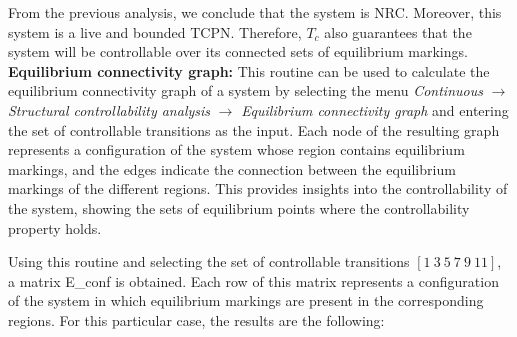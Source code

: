 From the previous analysis, we conclude that the system is NRC. Moreover, this system is a live and bounded TCPN. Therefore, $T_c$ also guarantees that the system will be controllable over its connected sets of equilibrium markings.\\ %


\textbf{Equilibrium connectivity graph: } This routine can be used to calculate the equilibrium connectivity graph of a system by selecting the menu \textit{Continuous} $\rightarrow$ \textit{Structural controllability analysis} $\rightarrow$ \textit{Equilibrium connectivity graph} and entering the set of controllable transitions as the input. Each node of the resulting graph represents a configuration of the system whose region contains equilibrium markings, and the edges indicate the connection between the equilibrium markings of the different regions. This provides insights into the controllability of the system, showing the sets of equilibrium points where the controllability property holds. 


Using this routine and selecting the set of controllable transitions $[1 \ 3 \ 5 \ 7 \ 9 \ 11]$, a matrix E\_conf is obtained. Each row of this matrix represents a configuration of the system in which equilibrium markings are present in the corresponding regions. For this particular case, the results are the following:


